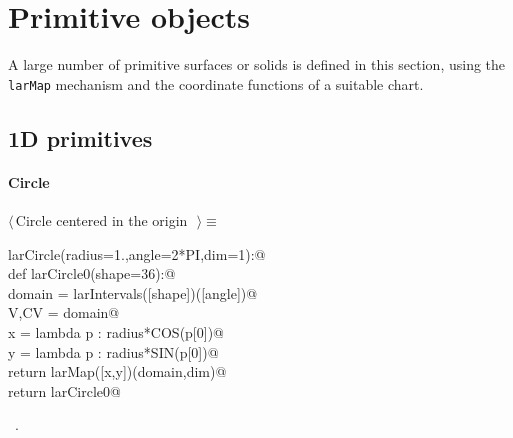 \documentclass[11pt,oneside]{article}	%
\begin{document}
\section{Primitive objects}
\label{sec:generators}

A large number of primitive surfaces or solids is defined in this section, using the \texttt{larMap} mechanism and the coordinate functions of a suitable chart.

\subsection{1D primitives}

\paragraph{Circle}
\begin{flushleft} \small \label{scrap6}
$\langle\,$Circle centered in the origin\nobreak\ {\footnotesize {}}$\,\rangle\equiv$
\vspace{-1ex}
\begin{list}{}{} \item
\mbox{}\verb@def larCircle(radius=1.,angle=2*PI,dim=1):@\\
\mbox{}\verb@   def larCircle0(shape=36):@\\
\mbox{}\verb@      domain = larIntervals([shape])([angle])@\\
\mbox{}\verb@      V,CV = domain@\\
\mbox{}\verb@      x = lambda p : radius*COS(p[0])@\\
\mbox{}\verb@      y = lambda p : radius*SIN(p[0])@\\
\mbox{}\verb@      return larMap([x,y])(domain,dim)@\\
\mbox{}\verb@   return larCircle0@\\
\mbox{}\verb@@{\NWsep}
\end{list}
\vspace{-1ex}
\footnotesize\addtolength{\baselineskip}{-1ex}
\begin{list}{}{\setlength{\itemsep}{-\parsep}\setlength{\itemindent}{-\leftmargin}}
\item \NWtxtMacroRefIn\ .
\end{list}
\end{flushleft}
\end{document}
